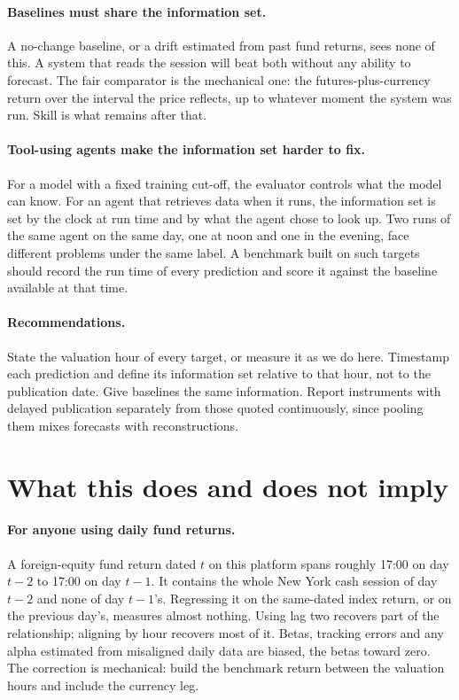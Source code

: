\documentclass[11pt,a4paper]{article}
\begin{document}
\paragraph{Baselines must share the information set.} A no-change baseline,
or a drift estimated from past fund returns, sees none of this. A system that
reads the session will beat both without any ability to forecast. The fair
comparator is the mechanical one: the futures-plus-currency return over the
interval the price reflects, up to whatever moment the system was run. Skill
is what remains after that.

\paragraph{Tool-using agents make the information set harder to fix.} For a
model with a fixed training cut-off, the evaluator controls what the model can
know. For an agent that retrieves data when it runs, the information set is
set by the clock at run time and by what the agent chose to look up. Two runs
of the same agent on the same day, one at noon and one in the evening, face
different problems under the same label. A benchmark built on such targets
should record the run time of every prediction and score it against the
baseline available at that time.

\paragraph{Recommendations.} State the valuation hour of every target, or
measure it as we do here. Timestamp each prediction and define its
information set relative to that hour, not to the publication date. Give
baselines the same information. Report instruments with delayed publication
separately from those quoted continuously, since pooling them mixes forecasts
with reconstructions.

\section{What this does and does not imply}\label{sec:implications}

\paragraph{For anyone using daily fund returns.} A foreign-equity fund return
dated $t$ on this platform spans roughly 17:00 on day $t-2$ to 17:00 on day
$t-1$. It contains the whole New York cash session of day $t-2$ and none of
day $t-1$'s. Regressing it on the same-dated index return, or on the
previous day's, measures almost nothing. Using lag two recovers part of the
relationship; aligning by hour recovers most of it. Betas, tracking errors and
any alpha estimated from misaligned daily data are biased, the betas toward
zero. The correction is mechanical: build the benchmark return between the
valuation hours and include the currency leg.
\end{document}
